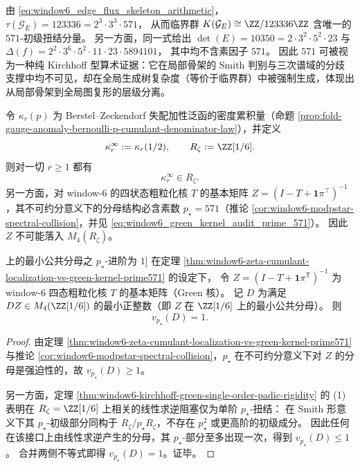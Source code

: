 \begin{remark}\label{rem:window6-kirchhoff-prime-571}
由 \eqref{eq:window6_edge_flux_skeleton_arithmetic}，
\(
\tau(\mathcal{G}_E)=123336=2^3\cdot 3^3\cdot 571
\)，
从而临界群 \(K(\mathcal{G}_E)\cong \ZZ/123336\ZZ\) 含唯一的 \(571\)-初级扭结分量。
另一方面，同一式给出
\(
\det(E)=10350=2\cdot 3^2\cdot 5^2\cdot 23
\)
与
\(
\Delta(f)=2^2\cdot 3^6\cdot 5^2\cdot 11\cdot 23\cdot 5894101
\)，
其中均不含素因子 \(571\)。
因此 \(571\) 可被视为一种纯 Kirchhoff 型算术证据：它在局部骨架的 Smith 判别与三次谱域的分歧支撑中均不可见，却在全局生成树复杂度（等价于临界群）中被强制生成，体现出从局部骨架到全局图复形的层级分离。
\end{remark}

\begin{theorem}[\texorpdfstring{$\{2,3\}$}{2,3}-局部化的累积量环与 Green 核分母素数 \texorpdfstring{$p_\star=571$}{p*=571} 的不可约分叉]\label{thm:window6-zeta-cumulant-localization-vs-green-kernel-prime571}
令 \(\kappa_r(p)\) 为 Berstel--Zeckendorf 失配加性泛函的密度累积量（命题 \ref{prop:fold-gauge-anomaly-bernoulli-p-cumulant-denominator-law}），并定义
\[
\kappa_r^\infty:=\kappa_r(1/2),
\qquad
R_\zeta:=\ZZ[1/6].
\]
则对一切 \(r\ge 1\) 都有
\[
\kappa_r^\infty\in R_\zeta.
\]
另一方面，对 window-\(6\) 的四状态粗粒化核 \(T\) 的基本矩阵
\(
Z=(I-T+\mathbf 1\pi^\top)^{-1}
\)，其不可约分意义下的分母结构必含素数 \(p_\star=571\)（推论 \ref{cor:window6-modpstar-spectral-collision}，并见 \eqref{eq:window6_green_kernel_audit_prime_571}）。
因此 \(Z\) 不可能落入 \(M_4(R_\zeta)\)。
\end{theorem}

\begin{corollary}[Green 核在 \(\ZZ[1/6]\) 上的最小公共分母之 \texorpdfstring{$p_\star$}{p*}-进阶为 \(1\)]\label{cor:window6-green-kernel-pstar-valuation-one}
在定理 \ref{thm:window6-zeta-cumulant-localization-vs-green-kernel-prime571} 的设定下，
令 \(Z=(I-T+\mathbf 1\pi^{\mathsf T})^{-1}\) 为 window-\(6\) 四态粗粒化核 \(T\) 的基本矩阵（Green 核）。
记 \(D\) 为满足 \(DZ\in M_4(\ZZ[1/6])\) 的最小正整数（即 \(Z\) 在 \(\ZZ[1/6]\) 上的最小公共分母）。
则
\[
v_{p_\star}(D)=1.
\]
\end{corollary}

\begin{proof}
由定理 \ref{thm:window6-zeta-cumulant-localization-vs-green-kernel-prime571} 与推论 \ref{cor:window6-modpstar-spectral-collision}，\(p_\star\) 在不可约分意义下对 \(Z\) 的分母是强迫性的，故 \(v_{p_\star}(D)\ge 1\)。
\par
另一方面，定理 \ref{thm:window6-kirchhoff-green-single-order-padic-rigidity} 的 (1) 表明在 \(R_\zeta=\ZZ[1/6]\) 上相关的线性求逆阻塞仅为单阶 \(p_\star\)-扭结：
在 Smith 形意义下其 \(p_\star\)-初级部分同构于 \(R_\zeta/p_\star R_\zeta\)，不存在 \(p_\star^2\) 或更高阶的初级成分。
因此任何在该接口上由线性求逆产生的分母，其 \(p_\star\)-部分至多出现一次，得到 \(v_{p_\star}(D)\le 1\)。
合并两侧不等式即得 \(v_{p_\star}(D)=1\)。证毕。
\end{proof}


